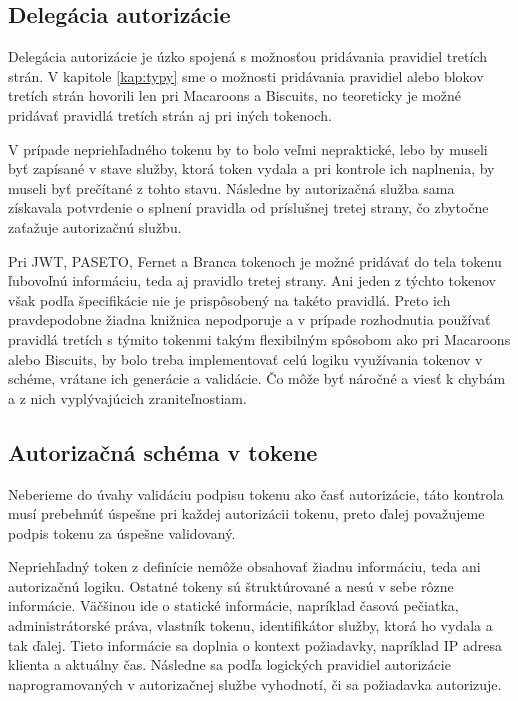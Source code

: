 \subsection{Delegácia autorizácie}

Delegácia autorizácie je úzko spojená s možnosťou pridávania pravidiel tretích strán. V kapitole \ref{kap:typy} sme o možnosti pridávania pravidiel alebo blokov tretích strán hovorili len pri Macaroons a Biscuits, no teoreticky je možné pridávať pravidlá tretích strán aj pri iných tokenoch. 

V prípade nepriehľadného tokenu by to bolo veľmi nepraktické, lebo by museli byť zapísané v stave služby, ktorá token vydala a pri kontrole ich naplnenia, by museli byť prečítané z tohto stavu. Následne by autorizačná služba sama získavala potvrdenie o splnení pravidla od príslušnej tretej strany, čo zbytočne zaťažuje autorizačnú službu.

Pri JWT, PASETO, Fernet a Branca tokenoch je možné pridávať do tela tokenu ľubovoľnú informáciu, teda aj pravidlo tretej strany. Ani jeden z týchto tokenov však podľa špecifikácie nie je prispôsobený na takéto pravidlá. Preto ich pravdepodobne žiadna knižnica nepodporuje a v prípade rozhodnutia používať pravidlá tretích s týmito tokenmi takým flexibilným spôsobom ako pri Macaroons alebo Biscuits, by bolo treba implementovať celú logiku využívania tokenov v schéme, vrátane ich generácie a validácie. Čo môže byť náročné a viesť k chybám a z nich vyplývajúcich zraniteľnostiam.

\subsection{Autorizačná schéma v tokene}

Neberieme do úvahy validáciu podpisu tokenu ako časť autorizácie, táto kontrola musí prebehnúť úspešne pri každej autorizácii tokenu, preto ďalej považujeme podpis tokenu za úspešne validovaný.

Nepriehľadný token z definície nemôže obsahovať žiadnu informáciu, teda ani autorizačnú logiku. Ostatné tokeny sú štruktúrované a nesú v sebe rôzne informácie. Väčšinou ide o statické informácie, napríklad časová pečiatka, administrátorské práva, vlastník tokenu, identifikátor služby, ktorá ho vydala a tak ďalej. Tieto informácie sa doplnia o kontext požiadavky, napríklad IP adresa klienta a aktuálny čas. Následne sa podľa logických pravidiel autorizácie naprogramovaných v autorizačnej službe vyhodnotí, či sa požiadavka autorizuje.


